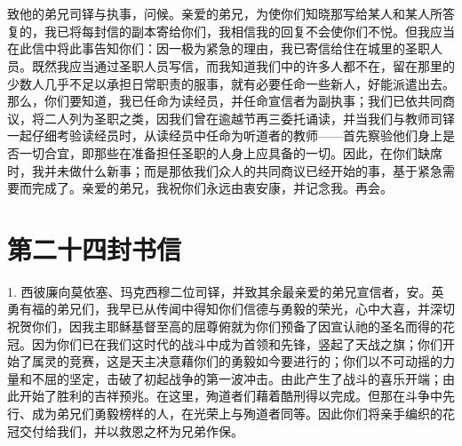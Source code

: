 \section{}

\par

\par

致他的弟兄司铎与执事，问候。亲爱的弟兄，为使你们知晓那写给某人和某人所答复的，我已将每封信的副本寄给你们，我相信我的回复不会使你们不悦。但我应当在此信中将此事告知你们：因一极为紧急的理由，我已寄信给住在城里的圣职人员。既然我应当通过圣职人员写信，而我知道我们中的许多人都不在，留在那里的少数人几乎不足以承担日常职责的服事，就有必要任命一些新人，好能派遣出去。那么，你们要知道，我已任命为读经员，并任命宣信者为副执事；我们已依共同商议，将二人列为圣职之类，因我们曾在逾越节再三委托诵读，并当我们与教师司铎一起仔细考验读经员时，从读经员中任命为听道者的教师——首先察验他们身上是否一切合宜，即那些在准备担任圣职的人身上应具备的一切。因此，在你们缺席时，我并未做什么新事；而是那依我们众人的共同商议已经开始的事，基于紧急需要而完成了。亲爱的弟兄，我祝你们永远由衷安康，并记念我。再会。\par



\section{第二十四封书信}

\par

\par

1. 西彼廉向莫依塞、玛克西穆二位司铎，并致其余最亲爱的弟兄宣信者，安。英勇有福的弟兄们，我早已从传闻中得知你们信德与勇毅的荣光，心中大喜，并深切祝贺你们，因我主耶稣基督至高的屈尊俯就为你们预备了因宣认祂的圣名而得的花冠。因为你们已在我们这时代的战斗中成为首领和先锋，竖起了天战之旗；你们开始了属灵的竞赛，这是天主决意藉你们的勇毅如今要进行的；你们以不可动摇的力量和不屈的坚定，击破了初起战争的第一波冲击。由此产生了战斗的喜乐开端；由此开始了胜利的吉祥预兆。在这里，殉道者们藉着酷刑得以完成。但那在斗争中先行、成为弟兄们勇毅榜样的人，在光荣上与殉道者同等。因此你们将亲手编织的花冠交付给我们，并以救恩之杯为兄弟作保。\par

